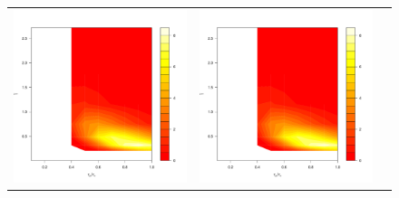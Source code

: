 \documentclass[10pt]{article}
\begin{document}
\begin{enumerate}
\begin{figure}
\begin{tabular}{ccc}
\begin{minipage}{0.33\textwidth}
      \centering
      \includegraphics[width=1\linewidth]{small-t-Galerkin-no-filter.pdf}
    \end{minipage}
    & \begin{minipage}{0.33\textwidth}
      \centering
      \includegraphics[width=1\linewidth]{small-t-Galerkin-no-filter.pdf}

\end{minipage}
\end{tabular}
\end{figure}
\end{enumerate}
\end{document}
